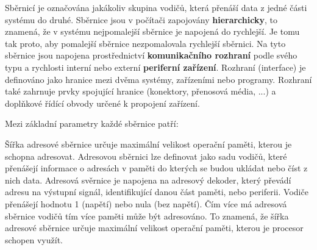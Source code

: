 %
%
%








\Obsah




Sběrnicí je označována jakákoliv skupina vodičů, která přenáší data z jedné části systému do druhé. Sběrnice jsou v počítači zapojovány {\bf hierarchicky}, to znamená, že v systému nejpomalejší sběrnice je napojená do rychlejší. Je tomu tak proto, aby pomalejší sběrnice nezpomalovala rychlejší sběrnici.  Na tyto sběrnice jsou napojena prostřednictví {\bf komunikačního rozhraní} podle svého typu a rychlosti interní nebo externí {\bf periferní zařízení}. Rozhraní (interface) je definováno jako hranice mezi dvěma systémy, zařízeními nebo programy. Rozhraní také zahrnuje prvky spojující hranice (konektory, přenosová média, ...) a doplňkové řídící obvody určené k propojení zařízení.

Mezi základní parametry každé sběrnice patří:

\vskip 4mm
\vskip 4mm


Šířka adresové sběrnice určuje maximální velikost operační paměti, kterou je schopna adresovat. Adresovou sběrnici lze definovat jako sadu vodičů, které přenášejí informace o adresách v paměti do kterých se budou ukládat nebo číst z nich data. Adresová svěrnice je napojena na adresový dekoder, který převádí adresu na výstupní signál, identifikující danou část paměti, nebo periferii. Vodiče přenášejí hodnotu 1 (napětí) nebo nula (bez napětí). Čím více má adresová sběrnice vodičů tím více paměti může být adresováno. To znamená, že šířka adresové sběrnice určuje maximální velikost operační paměti, kterou je procesor schopen využít.

